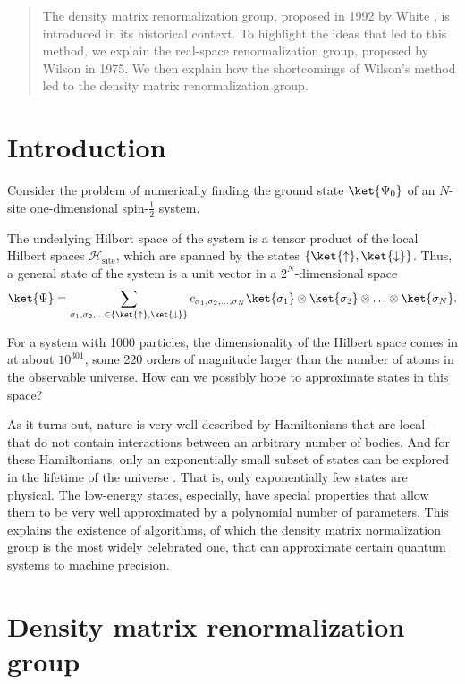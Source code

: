 \begin{abstract}
\noindent The density matrix renormalization group, proposed in 1992 by White
\cite{white1992density}, is introduced in its historical context. To highlight the ideas
that led to this method, we explain the real-space renormalization group, proposed by
Wilson \cite{wilson1975renormalization} in 1975. We then explain how the shortcomings of
Wilson's method led to the density matrix renormalization group.
\end{abstract}

\section{Introduction}
Consider the problem of numerically finding the ground state $\ket{\Psi_0}$ of an
$N$-site one-dimensional spin-$\frac{1}{2}$ system.

The underlying Hilbert space of the system is a tensor product of the
local Hilbert spaces $\mathcal{H}_{\text{site}}$, which are spanned by the
states $\{\ket{\uparrow}, \ket{\downarrow}\}$. Thus, a general state of the system is a unit vector in
a $2^N$-dimensional space
\begin{equation}
  \ket{\Psi} = \sum_{\sigma_1, \sigma_2, \ldots \in \{\ket{\uparrow}, \ket{\downarrow}\}}
  c_{\sigma_1, \sigma_2, \ldots, \sigma_N} \ket{\sigma_1} \otimes \ket{\sigma_2} \otimes
  \ldots \otimes \ket{\sigma_N}.
\end{equation}

For a system with 1000 particles, the dimensionality of the Hilbert
space comes in at about $10^{301}$, some 220 orders of magnitude larger than the number of
atoms in the observable universe. How can we possibly hope to approximate states in this
space?

As it turns out, nature is very well described by Hamiltonians that are local -- that do
not contain interactions between an arbitrary number of bodies. And for these
Hamiltonians, only an exponentially small subset of states can be explored in the lifetime
of the universe \cite{poulin2011quantum}. That is, only exponentially few states are
physical. The low-energy states, especially, have special properties that allow them to be
very well approximated by a polynomial number of parameters. This explains the existence
of algorithms, of which the density matrix normalization group is the most widely
celebrated one, that can approximate certain quantum systems to machine precision.

\section{Density matrix renormalization group}

